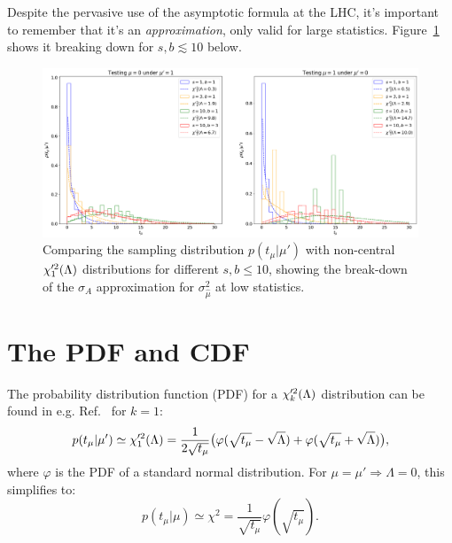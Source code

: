 Despite the pervasive use of the asymptotic formula at the LHC, it's important to remember that it's an \textit{approximation}, only valid for large statistics.
Figure~\ref{fig:ptmu_asym3} shows it breaking down for $s, b \lesssim 10$ below.

\begin{figure}[htb]
  \centering
  \includegraphics[width=\textwidth]{figures/06-asymptotic-plr/4.png}
  \caption{Comparing the sampling distribution $p(t_\mu|\mu')$ with non-central $\chi^{\prime 2}_1(\Lambda)$ distributions for different $s, b \leq 10$, showing the break-down of the $\sigma_A$ approximation for $\sigma^2_{\hat\mu}$ at low statistics.}
  \label{fig:ptmu_asym3}
\end{figure}

\section{The PDF and CDF}

The probability distribution function (PDF) for a $\chi^{\prime 2}_k(\Lambda)$ distribution can be found in e.g. Ref.~\cite{enwiki:1256854724} for $k=1$:
\begin{equation}
    p(t_\mu|\mu') \simeq \chi^{\prime 2}_1(\Lambda) = \frac{1}{2\sqrt{t_\mu}}\big(\varphi(\sqrt{t_\mu} - \sqrt\Lambda) + \varphi(\sqrt{t_\mu} + \sqrt\Lambda)\big),
\label{eq:ptmu_pdf}
\end{equation}
where $\varphi$ is the PDF of a standard normal distribution.
For $\mu = \mu' \Rightarrow \Lambda = 0$, this simplifies to:
\begin{equation}
    p(t_\mu|\mu) \simeq \chi^2 = \frac{1}{\sqrt{t_\mu}}\varphi(\sqrt{t_\mu}).
\label{eq:ptmu_pdf_special}
\end{equation}

